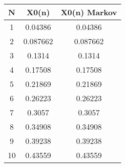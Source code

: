 \begin{tabular}{|c|c|c|}
\hline
\textbf{N}&\textbf{X0(n)}&\textbf{X0(n) Markov}\\\hline
1&0.04386&0.04386\\\hline
2&0.087662&0.087662\\\hline
3&0.1314&0.1314\\\hline
4&0.17508&0.17508\\\hline
5&0.21869&0.21869\\\hline
6&0.26223&0.26223\\\hline
7&0.3057&0.3057\\\hline
8&0.34908&0.34908\\\hline
9&0.39238&0.39238\\\hline
10&0.43559&0.43559\\\hline
\end{tabular}
